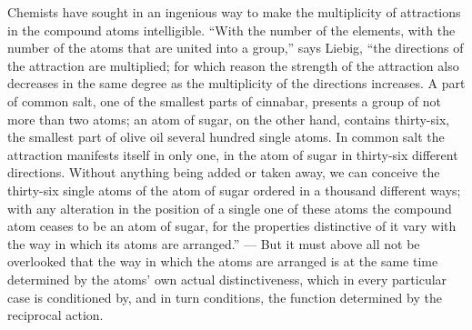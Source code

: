 \documentclass[12pt,a4paper]{book}
\begin{document}
Chemists have sought in an ingenious way to make the multiplicity of
attractions in the compound atoms intelligible. ``With the number of the
elements, with the number of the atoms that are united into a group,'' says
Liebig, ``the directions of the attraction are multiplied; for which reason the
strength of the attraction also decreases in the same degree as the
multiplicity of the directions increases. A part of common salt, one of the
smallest parts of cinnabar, presents a group of not more than two atoms; an
atom of sugar, on the other hand, contains thirty-six, the smallest part of
olive oil several hundred single atoms. In common salt the attraction manifests
itself in only one, in the atom of sugar in thirty-six different directions.
Without anything being added or taken away, we can conceive the thirty-six
single atoms of the atom of sugar ordered in a thousand different ways; with
any alteration in the position of a single one of these atoms the compound atom
ceases to be an atom of sugar, for the properties distinctive of it vary with
the way in which its atoms are arranged.'' --- But it must above all not be
overlooked that the way in which the atoms are arranged is at the same time
determined by the atoms' own actual distinctiveness, which in every particular
case is conditioned by, and in turn conditions, the function determined by the
reciprocal action.
\end{document}
